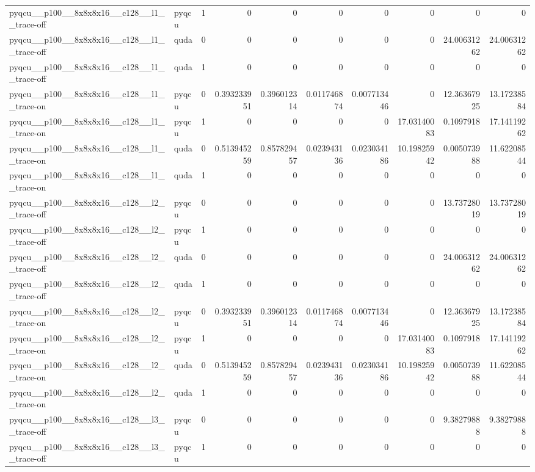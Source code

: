 \begin{table}[htbp]
\begin{tabular}{@{}llrrrrrrrr@{}}
pyqcu\_\_p100\_\_8x8x8x16\_\_c128\_\_l1\_\_trace-off & pyqcu & 1 & 0 & 0 & 0 & 0 & 0 & 0 & 0 \\
pyqcu\_\_p100\_\_8x8x8x16\_\_c128\_\_l1\_\_trace-off & quda & 0 & 0 & 0 & 0 & 0 & 0 & 24.00631262 & 24.00631262 \\
pyqcu\_\_p100\_\_8x8x8x16\_\_c128\_\_l1\_\_trace-off & quda & 1 & 0 & 0 & 0 & 0 & 0 & 0 & 0 \\
pyqcu\_\_p100\_\_8x8x8x16\_\_c128\_\_l1\_\_trace-on & pyqcu & 0 & 0.393233951 & 0.396012314 & 0.011746874 & 0.007713446 & 0 & 12.36367925 & 13.17238584 \\
pyqcu\_\_p100\_\_8x8x8x16\_\_c128\_\_l1\_\_trace-on & pyqcu & 1 & 0 & 0 & 0 & 0 & 17.03140083 & 0.1097918 & 17.14119262 \\
pyqcu\_\_p100\_\_8x8x8x16\_\_c128\_\_l1\_\_trace-on & quda & 0 & 0.513945259 & 0.857829457 & 0.023943136 & 0.023034186 & 10.19825942 & 0.005073988 & 11.62208544 \\
pyqcu\_\_p100\_\_8x8x8x16\_\_c128\_\_l1\_\_trace-on & quda & 1 & 0 & 0 & 0 & 0 & 0 & 0 & 0 \\
pyqcu\_\_p100\_\_8x8x8x16\_\_c128\_\_l2\_\_trace-off & pyqcu & 0 & 0 & 0 & 0 & 0 & 0 & 13.73728019 & 13.73728019 \\
pyqcu\_\_p100\_\_8x8x8x16\_\_c128\_\_l2\_\_trace-off & pyqcu & 1 & 0 & 0 & 0 & 0 & 0 & 0 & 0 \\
pyqcu\_\_p100\_\_8x8x8x16\_\_c128\_\_l2\_\_trace-off & quda & 0 & 0 & 0 & 0 & 0 & 0 & 24.00631262 & 24.00631262 \\
pyqcu\_\_p100\_\_8x8x8x16\_\_c128\_\_l2\_\_trace-off & quda & 1 & 0 & 0 & 0 & 0 & 0 & 0 & 0 \\
pyqcu\_\_p100\_\_8x8x8x16\_\_c128\_\_l2\_\_trace-on & pyqcu & 0 & 0.393233951 & 0.396012314 & 0.011746874 & 0.007713446 & 0 & 12.36367925 & 13.17238584 \\
pyqcu\_\_p100\_\_8x8x8x16\_\_c128\_\_l2\_\_trace-on & pyqcu & 1 & 0 & 0 & 0 & 0 & 17.03140083 & 0.1097918 & 17.14119262 \\
pyqcu\_\_p100\_\_8x8x8x16\_\_c128\_\_l2\_\_trace-on & quda & 0 & 0.513945259 & 0.857829457 & 0.023943136 & 0.023034186 & 10.19825942 & 0.005073988 & 11.62208544 \\
pyqcu\_\_p100\_\_8x8x8x16\_\_c128\_\_l2\_\_trace-on & quda & 1 & 0 & 0 & 0 & 0 & 0 & 0 & 0 \\
pyqcu\_\_p100\_\_8x8x8x16\_\_c128\_\_l3\_\_trace-off & pyqcu & 0 & 0 & 0 & 0 & 0 & 0 & 9.38279888 & 9.38279888 \\
pyqcu\_\_p100\_\_8x8x8x16\_\_c128\_\_l3\_\_trace-off & pyqcu & 1 & 0 & 0 & 0 & 0 & 0 & 0 & 0 \\

\end{tabular}
\end{table}
